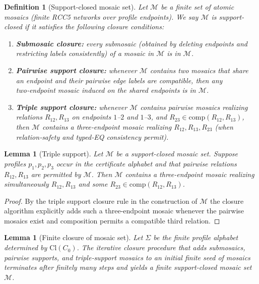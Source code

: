 \documentclass[11pt]{article}
\newcommand{\Cl}{\mathrm{Cl}}
\newtheorem{lemma}[theorem]{Lemma}
\newtheorem{definition}[theorem]{Definition}
\begin{document}
\begin{definition}[Support-closed mosaic set]
\label{def:support-closed}
Let $\mathcal{M}$ be a finite set of atomic mosaics (finite RCC5 networks over profile endpoints).
We say $\mathcal{M}$ is \emph{support-closed} if it satisfies the following closure conditions:
\begin{enumerate}[label=(SC\arabic*)]
  \item \textbf{Submosaic closure:} every submosaic (obtained by deleting endpoints and restricting labels consistently) of a mosaic in $\mathcal{M}$ is in $\mathcal{M}$.
  \item \textbf{Pairwise support closure:} whenever $\mathcal{M}$ contains two mosaics that share an endpoint and their pairwise edge labels are compatible, then any two‑endpoint mosaic induced on the shared endpoints is in $\mathcal{M}$.
  \item \textbf{Triple support closure:} whenever $\mathcal{M}$ contains pairwise mosaics realizing relations $R_{12},R_{13}$ on endpoints $1$--$2$ and $1$--$3$, and $R_{23}\in\mathrm{comp}(R_{12},R_{13})$, then $\mathcal{M}$ contains a three‑endpoint mosaic realizing $R_{12},R_{13},R_{23}$ (when relation‑safety and typed‑EQ consistency permit).
\end{enumerate}
\end{definition}


\begin{lemma}[Triple support]
Let $\mathcal{M}$ be a support-closed mosaic set. Suppose profiles $p_1,p_2,p_3$
occur in the certificate alphabet and that pairwise relations $R_{12},R_{13}$
are permitted by $\mathcal{M}$. Then $\mathcal{M}$ contains a three-endpoint
mosaic realizing simultaneously $R_{12},R_{13}$ and some
$R_{23}\in\mathrm{comp}(R_{12},R_{13})$.
\end{lemma}

\begin{proof}
By the triple support closure rule in the construction of $\mathcal{M}$ the
closure algorithm explicitly adds such a three-endpoint mosaic whenever the
pairwise mosaics exist and composition permits a compatible third relation.
\end{proof}


\begin{lemma}[Finite closure of mosaic set]
\label{lem:closure-finite}
Let $\Sigma$ be the finite profile alphabet determined by $\Cl(C_0)$. The iterative closure procedure that adds submosaics, pairwise supports, and triple‑support mosaics to an initial finite seed of mosaics terminates after finitely many steps and yields a finite support‑closed mosaic set $\mathcal{M}$.
\end{lemma}
\end{document}
